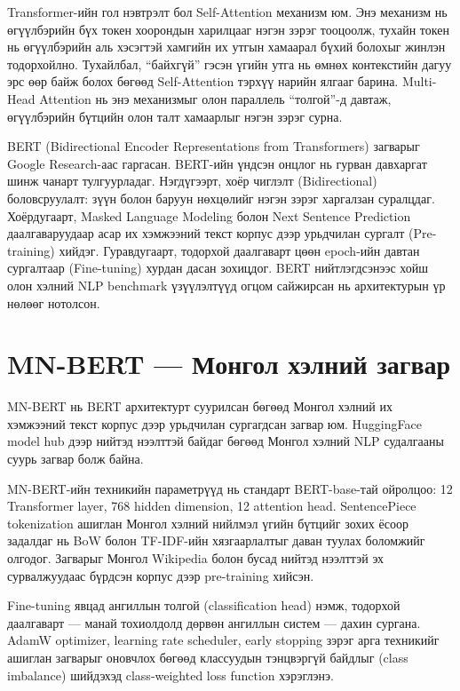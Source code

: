 Transformer-ийн гол нэвтрэлт бол Self-Attention механизм юм. Энэ механизм нь
өгүүлбэрийн бүх токен хоорондын харилцааг нэгэн зэрэг тооцоолж, тухайн токен
нь өгүүлбэрийн аль хэсэгтэй хамгийн их утгын хамаарал бүхий болохыг жинлэн
тодорхойлно. Тухайлбал, ``байхгүй'' гэсэн үгийн утга нь өмнөх контекстийн дагуу
эрс өөр байж болох бөгөөд Self-Attention тэрхүү нарийн ялгааг барина.
Multi-Head Attention нь энэ механизмыг олон параллель ``толгой''-д давтаж,
өгүүлбэрийн бүтцийн олон талт хамаарлыг нэгэн зэрэг сурна.

BERT (Bidirectional Encoder Representations from Transformers) загварыг
\cite{devlin2019} Google Research-аас гаргасан. BERT-ийн үндсэн онцлог нь гурван
давхаргат шинж чанарт тулгуурладаг. Нэгдүгээрт, хоёр чиглэлт (Bidirectional)
боловсруулалт: зүүн болон баруун нөхцөлийг нэгэн зэрэг харгалзан суралцдаг.
Хоёрдугаарт, Masked Language Modeling болон Next Sentence Prediction
даалгаваруудаар асар их хэмжээний текст корпус дээр урьдчилан сургалт
(Pre-training) хийдэг. Гуравдугаарт, тодорхой даалгаварт цөөн epoch-ийн давтан
сургалтаар (Fine-tuning) хурдан дасан зохицдог. BERT нийтлэгдсэнээс хойш олон
хэлний NLP benchmark үзүүлэлтүүд огцом сайжирсан нь архитектурын үр нөлөөг
нотолсон.

\section{MN-BERT --- Монгол хэлний загвар}

MN-BERT нь BERT архитектурт суурилсан бөгөөд Монгол хэлний их хэмжээний текст
корпус дээр урьдчилан сургагдсан загвар юм. HuggingFace model hub дээр нийтэд
нээлттэй байдаг бөгөөд Монгол хэлний NLP судалгааны суурь загвар болж байна.

MN-BERT-ийн техникийн параметрүүд нь стандарт BERT-base-тай ойролцоо: 12
Transformer layer, 768 hidden dimension, 12 attention head. SentencePiece
tokenization ашиглан Монгол хэлний нийлмэл үгийн бүтцийг зохих ёсоор задалдаг
нь BoW болон TF-IDF-ийн хязгаарлалтыг даван туулах боломжийг олгодог. Загварыг
Монгол Wikipedia болон бусад нийтэд нээлттэй эх сурвалжуудаас бүрдсэн корпус
дээр pre-training хийсэн.

Fine-tuning явцад ангиллын толгой (classification head) нэмж, тодорхой даалгаварт
--- манай тохиолдолд дөрвөн ангиллын систем --- дахин сургана. AdamW optimizer,
learning rate scheduler, early stopping зэрэг арга техникийг ашиглан загварыг
оновчлох бөгөөд классуудын тэнцвэргүй байдлыг (class imbalance) шийдэхэд
class-weighted loss function хэрэглэнэ.

